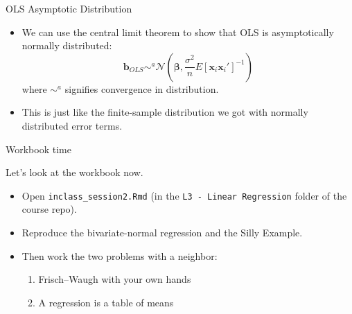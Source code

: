 \documentclass[aspectratio=169,11pt]{beamer}
\begin{document}
\begin{frame}{OLS Asymptotic Distribution}
\begin{itemize}
	\item We can use the central limit theorem to show that OLS is asymptotically
	normally distributed:\[
\boldsymbol{b}_{OLS}\sim^{a}\mathcal{N}\left(\boldsymbol{\beta},\frac{\sigma^{2}}{n}E\left[\boldsymbol{x}_{i}\boldsymbol{x}_{i}'\right]^{-1}\right)
\]
	where $ \sim^{a}$ signifies convergence in distribution. 

	\item This is just like the finite-sample distribution
	we got with normally distributed error terms.
\end{itemize}
\end{frame}


\begin{frame}{Workbook time}
\begin{center}
{\LARGE \alert{Let's look at the workbook now.}}
\end{center}
\bigskip
\begin{itemize}
	\item Open \texttt{inclass\_session2.Rmd} (in the \texttt{L3 - Linear Regression} folder of the course repo).
	\item Reproduce the bivariate-normal regression and the Silly Example.
	\item Then work the two problems with a neighbor:
	\begin{enumerate}
		\item Frisch--Waugh with your own hands
		\item A regression is a table of means
	\end{enumerate}
\end{itemize}
\end{frame}
\end{document}
